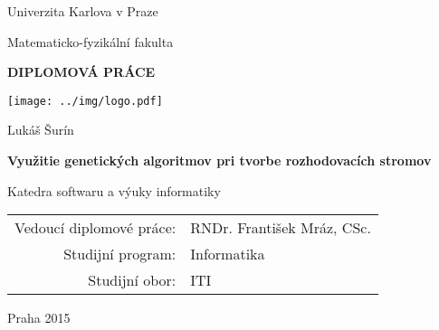 \documentclass[12pt,a4paper]{report}
\theoremstyle{definition}
\begin{document}


\pagestyle{empty}
\begin{center}

\large

Univerzita Karlova v Praze

\medskip

Matematicko-fyzikální fakulta

\vfill

{\bf\Large DIPLOMOVÁ PRÁCE}

\vfill

\centerline{\mbox{\texttt{[image: ../img/logo.pdf]}}}

\vfill
\vspace{5mm}

{\LARGE Lukáš Šurín}

\vspace{15mm}

{\LARGE\bfseries Využitie genetických algoritmov pri tvorbe rozhodovacích stromov}

\vfill

Katedra softwaru a výuky informatiky

\vfill

\begin{tabular}{rl}

Vedoucí diplomové práce: & RNDr. František Mráz, CSc. \\
\noalign{\vspace{2mm}}
Studijní program: & Informatika \\
\noalign{\vspace{2mm}}
Studijní obor: & ITI \\
\end{tabular}

\vfill

Praha 2015

\end{center}

\newpage


\end{document}
